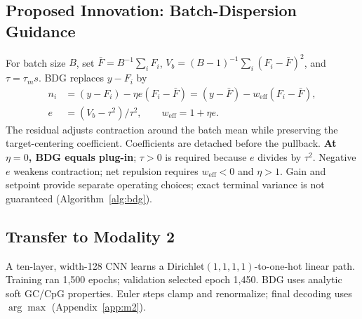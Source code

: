 \documentclass{article}
\newcommand{\Fbar}{\bar F}
\newcommand{\Vb}{V_b}
\newcommand{\weff}{w_{\mathrm{eff}}}
\begin{document}
\subsection{Proposed Innovation: Batch-Dispersion Guidance}\label{sec:bdg}
For batch size $B$, set $\Fbar=B^{-1}\sum_iF_i$, $\Vb=(B-1)^{-1}\sum_i(F_i-\Fbar)^2$, and $\tau=\tau_m s$. BDG replaces $y-F_i$ by
\begin{equation}
\begin{aligned}
n_i&=(y-F_i)-\eta e(F_i-\Fbar)=(y-\Fbar)-\weff(F_i-\Fbar),\\
e&=(\Vb-\tau^2)/\tau^2,\qquad \weff=1+\eta e.
\end{aligned}\label{eq:bdg}
\end{equation}
The residual adjusts contraction around the batch mean while preserving the target-centering coefficient. Coefficients are detached before the pullback. \textbf{At $\eta=0$, BDG equals plug-in}; $\tau>0$ is required because $e$ divides by $\tau^2$. Negative $e$ weakens contraction; net repulsion requires $\weff<0$ and $\eta>1$. Gain and setpoint provide separate operating choices; exact terminal variance is not guaranteed (Algorithm~\ref{alg:bdg}).

\subsection{Transfer to Modality 2}\label{sec:transfer}
A ten-layer, width-128 CNN learns a Dirichlet$(1,1,1,1)$-to-one-hot linear path. Training ran 1,500 epochs; validation selected epoch 1,450. BDG uses analytic soft GC/CpG properties. Euler steps clamp and renormalize; final decoding uses $\arg\max$ (Appendix~\ref{app:m2}).
\end{document}
